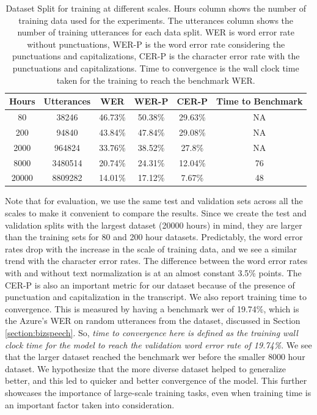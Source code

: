 \begin{table}[ht]
\centering
\begin{tabular}{c c c c c c}
\hline
  Hours & Utterances & WER & WER-P & CER-P & Time to Benchmark\\
 \hline
  80 & 38246 & 46.73\% & 50.38\% & 29.63\% & NA\\ 
  200 & 94840 & 43.84\% & 47.84\% & 29.08\% & NA\\
  2000 & 964824 & 33.76\% & 38.52\% & 27.8\% & NA\\
  8000 & 3480514 & 20.74\% & 24.31\% & 12.04\% & 76\\
  20000 & 8809282 & 14.01\% & 17.12\% & 7.67\% & 48\\
 \hline
\end{tabular}
\caption{\label{table:datascales}Dataset Split for training at different scales. Hours column shows the number of training data used for the experiments. The utterances column shows the number of training utterances for each data split. WER is word error rate without punctuations, WER-P is the word error rate considering the punctuations and capitalizations, CER-P is the character error rate with the punctuations and capitalizations. Time to convergence is the wall clock time taken for the training to reach the benchmark WER.}
\end{table}

Note that for evaluation, we use the same test and validation sets across all the scales to make it convenient to compare the results. Since we create the test and validation splits with the largest dataset (20000 hours) in mind, they are larger than the training sets for 80 and 200 hour datasets. Predictably, the word error rates drop with the increase in the scale of training data, and we see a similar trend with the character error rates. The difference between the word error rates with and without text normalization is at an almost constant 3.5\% points. The CER-P is also an important metric for our dataset because of the presence of punctuation and capitalization in the transcript. We also report training time to convergence. This is measured by having a benchmark \acrshort{wer} of 19.74\%, which is the Azure's WER on random utterances from the dataset, discussed in Section \ref{section:bizspeech}. So, \emph{time to convergence here is defined as the training wall clock time for the model to reach the validation word error rate of 19.74\%}. We see that the larger dataset reached the benchmark \acrshort{wer} before the smaller 8000 hour dataset. We hypothesize that the more diverse dataset helped to generalize better, and this led to quicker and better convergence of the model. This further showcases the importance of large-scale training tasks, even when training time is an important factor taken into consideration.

